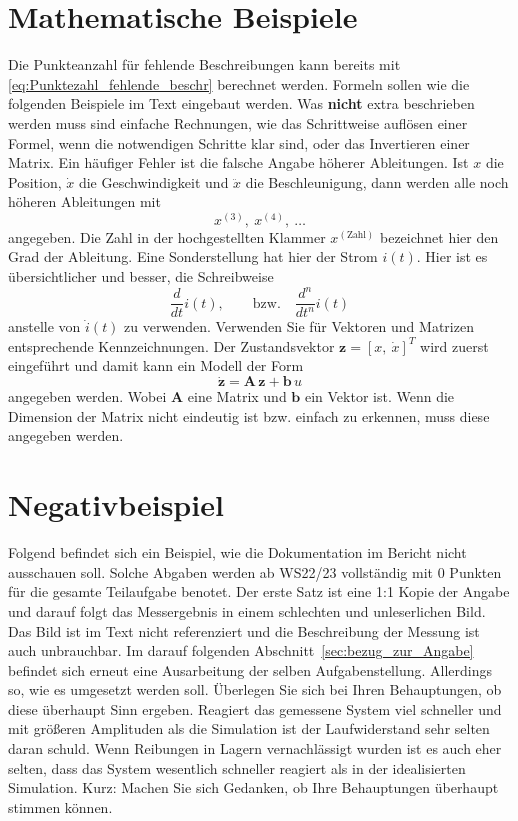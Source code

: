 \section{Mathematische Beispiele}\label{sec:mathematik}
Die Punkteanzahl für fehlende Beschreibungen kann bereits mit \eqref{eq:Punktezahl_fehlende_beschr} berechnet werden. Formeln sollen wie die folgenden Beispiele im Text eingebaut werden. Was \textbf{nicht} extra beschrieben werden muss sind einfache Rechnungen, wie das Schrittweise auflösen einer Formel, wenn die notwendigen Schritte klar sind, oder das Invertieren einer Matrix. Ein häufiger Fehler ist die falsche Angabe höherer Ableitungen. Ist $x$ die Position, $\dot{x}$ die Geschwindigkeit und $\ddot{x}$ die Beschleunigung, dann werden alle noch höheren Ableitungen mit
\begin{equation}
	x^{\left(3\right)}, \ x^{\left(4\right)}, \ \dots
\end{equation}
angegeben. Die Zahl in der hochgestellten Klammer $x^{\left( \text{Zahl} \right)}$ bezeichnet hier den Grad der Ableitung. Eine Sonderstellung hat hier der Strom $i \! \left(t\right) $. Hier ist es übersichtlicher und besser, die Schreibweise
\begin{equation}
	\frac{d}{d t}i\! \left(t\right), \qquad \text{bzw.} \quad \frac{d^n}{d t^n}i\! \left(t\right)
\end{equation}
anstelle von $\dot{i}\! \left(t\right)$ zu verwenden. Verwenden Sie für Vektoren und Matrizen entsprechende Kennzeichnungen. Der Zustandsvektor $\bm{z} = \left[x, \ \dot{x}\right]^T$ wird zuerst eingeführt und damit kann ein Modell der Form
\begin{equation}\label{eq:bsp_modellgleichung}
	\dot{\bm{z}} = \bm{A} \, \bm{z} + \bm{b} \, u
\end{equation}
angegeben werden. Wobei $\bm{A}$ eine Matrix und $\bm{b}$ ein Vektor ist. Wenn die Dimension der Matrix nicht eindeutig ist bzw. einfach zu erkennen, muss diese angegeben werden.



\section{Negativbeispiel}\label{sec:negativbeispiel}
Folgend befindet sich ein Beispiel, wie die Dokumentation im Bericht nicht ausschauen soll. Solche Abgaben werden ab WS22/23 vollständig mit 0 Punkten für die gesamte Teilaufgabe benotet. Der erste Satz ist eine 1:1 Kopie der Angabe und darauf folgt das Messergebnis in einem schlechten und unleserlichen Bild. Das Bild ist im Text nicht referenziert und die Beschreibung der Messung ist auch unbrauchbar. Im darauf folgenden Abschnitt~\ref{sec:bezug_zur_Angabe} befindet sich erneut eine Ausarbeitung der selben Aufgabenstellung. Allerdings so, wie es umgesetzt werden soll. Überlegen Sie sich bei Ihren Behauptungen, ob diese überhaupt Sinn ergeben. Reagiert das gemessene System viel schneller und mit größeren Amplituden als die Simulation ist der Laufwiderstand sehr selten daran schuld. Wenn Reibungen in Lagern vernachlässigt wurden ist es auch eher selten, dass das System wesentlich schneller reagiert als in der idealisierten Simulation. Kurz: Machen Sie sich Gedanken, ob Ihre Behauptungen überhaupt stimmen können.

